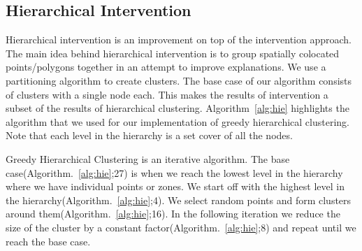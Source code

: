 \subsection{Hierarchical Intervention}
\label{sec:hie_impl}
Hierarchical intervention is an improvement on top of the intervention approach. The main idea behind hierarchical intervention is to group spatially colocated points/polygons together in an attempt to improve explanations. We use a partitioning algorithm to create clusters. The base case of our algorithm consists of clusters with a single node each. This makes the results of intervention a subset of the results of hierarchical clustering. Algorithm~\ref{alg:hie} highlights the algorithm that we used for our implementation of greedy hierarchical clustering. Note that each level in the hierarchy is a set cover of all the nodes.

Greedy Hierarchical Clustering is an iterative algorithm. The base case(Algorithm.~\ref{alg:hie};27) is when we reach the lowest level in the hierarchy where we have individual points or zones. We start off with the highest level in the hierarchy(Algorithm.~\ref{alg:hie};4). We select random points and form clusters around them(Algorithm.~\ref{alg:hie};16). In the following iteration we reduce the size of the cluster by a constant factor(Algorithm.~\ref{alg:hie};8) and repeat until we reach the base case.


